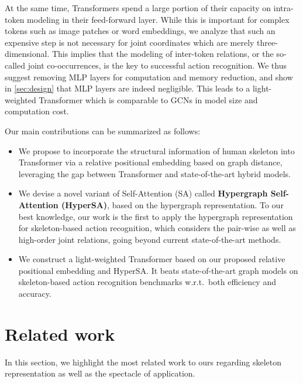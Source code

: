 \documentclass[10pt,twocolumn,letterpaper]{article}
\begin{document}
At the same time, Transformers spend a large portion of their capacity on intra-token modeling in their feed-forward layer. While this is important for complex tokens such as image patches or word embeddings, we analyze that such an expensive step is not necessary for joint coordinates which are merely three-dimensional. This implies that the modeling of inter-token relations, or the so-called joint co-occurrences, is the key to successful action recognition. We thus suggest removing MLP layers for computation and memory reduction, and show in \cref{sec:design} that MLP layers are indeed negligible.
This leads to a light-weighted Transformer which is comparable to GCNs in model size and computation cost. 







Our main contributions can be summarized as follows:
\begin{itemize}
    \item We propose to incorporate the structural information of human skeleton into Transformer via a relative positional embedding based on graph distance, leveraging the gap between Transformer and state-of-the-art hybrid models. 
    
    \item We devise a novel variant of Self-Attention (SA) called \textbf{Hypergraph Self-Attention (HyperSA)}, based on the hypergraph representation. 
    To our best knowledge, our work is the first to apply the hypergraph representation for skeleton-based action recognition, which considers the pair-wise as well as high-order joint relations, going beyond current state-of-the-art methods. 
    
    \item We construct a light-weighted Transformer based on our proposed relative positional embedding and HyperSA. It beats state-of-the-art graph models on skeleton-based action recognition benchmarks w.r.t.~both efficiency and accuracy.
\end{itemize}







\section{Related work}
In this section, we highlight the most related work to ours regarding skeleton representation as well as the spectacle of application.
\end{document}
